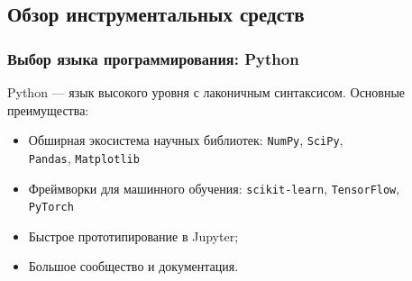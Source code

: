 %
%
\subsection{Обзор инструментальных средств}
\label{sec:tools}

\subsubsection{Выбор языка программирования: Python}
\label{sec:tools_python}

Python — язык высокого уровня с лаконичным синтаксисом. Основные преимущества:
\begin{itemize}
  \item Обширная экосистема научных библиотек: \texttt{NumPy}, \texttt{SciPy}, \\ \texttt{Pandas}, \texttt{Matplotlib}
  \item Фреймворки для машинного обучения: \texttt{scikit-learn}, \texttt{TensorFlow}, \\ \texttt{PyTorch}
  \item Быстрое прототипирование в Jupyter;
  \item Большое сообщество и документация.
\end{itemize}

